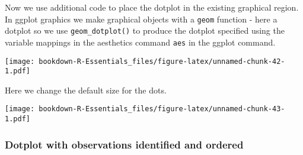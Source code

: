 \documentclass[]{book}
\newenvironment{Shaded}{\begin{snugshade}}{\end{snugshade}}
\newcommand{\KeywordTok}[1]{\textcolor[rgb]{0.13,0.29,0.53}{\textbf{#1}}}
\newcommand{\DataTypeTok}[1]{\textcolor[rgb]{0.13,0.29,0.53}{#1}}
\newcommand{\DecValTok}[1]{\textcolor[rgb]{0.00,0.00,0.81}{#1}}
\newcommand{\FloatTok}[1]{\textcolor[rgb]{0.00,0.00,0.81}{#1}}
\newcommand{\StringTok}[1]{\textcolor[rgb]{0.31,0.60,0.02}{#1}}
\newcommand{\CommentTok}[1]{\textcolor[rgb]{0.56,0.35,0.01}{\textit{#1}}}
\newcommand{\OperatorTok}[1]{\textcolor[rgb]{0.81,0.36,0.00}{\textbf{#1}}}
\newcommand{\NormalTok}[1]{#1}
\begin{document}
Now we use additional code to place the dotplot in the existing
graphical region. In ggplot graphics we make graphical objects with a
\texttt{geom} function - here a dotplot so we use
\texttt{geom\_dotplot()} to produce the dotplot specified using the
variable mappings in the aesthetics command \texttt{aes} in the ggplot
command.

\begin{Shaded}
\end{Shaded}

\texttt{[image: bookdown-R-Essentials\_files/figure-latex/unnamed-chunk-42-1.pdf]}

Here we change the default size for the dots.

\begin{Shaded}
\end{Shaded}

\texttt{[image: bookdown-R-Essentials\_files/figure-latex/unnamed-chunk-43-1.pdf]}

\subsubsection{Dotplot with observations identified and
ordered}\label{dotplot-with-observations-identified-and-ordered}
\end{document}
